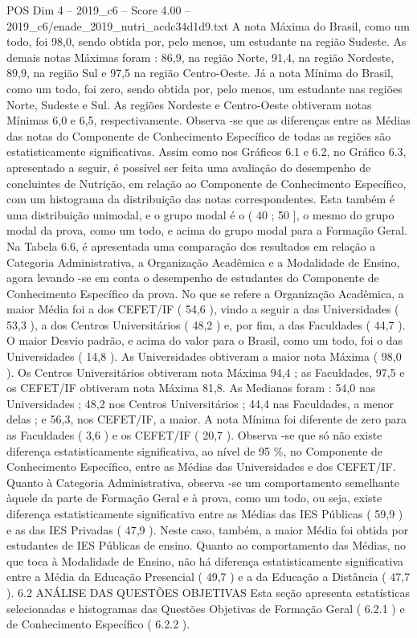 \begin{textsample}{POS Dim 4 – 2019\_c6 – Score 4.00 – 2019\_c6/enade\_2019\_nutri\_acdc34d1d9.txt}
A nota Máxima do Brasil, como um todo, foi 98,0, sendo obtida por, pelo menos, um estudante na região Sudeste.
As demais notas Máximas foram : 86,9, na região Norte, 91,4, na região Nordeste, 89,9, na região Sul e 97,5 na região Centro-Oeste.
Já a nota Mínima do Brasil, como um todo, foi zero, sendo obtida por, pelo menos, um estudante nas regiões Norte, Sudeste e Sul.
As regiões Nordeste e Centro-Oeste obtiveram notas Mínimas 6,0 e 6,5, respectivamente.
Observa -se que as diferenças entre as Médias das notas do Componente de Conhecimento Específico de todas as regiões são estatisticamente significativas.
Assim como nos Gráficos 6.1 e 6.2, no Gráfico 6.3, apresentado a seguir, é possível ser feita uma avaliação do desempenho de concluintes de Nutrição, em relação ao Componente de Conhecimento Específico, com um histograma da distribuição das notas correspondentes.
Esta também é uma distribuição unimodal, e o grupo modal é o ( 40 ; 50 ], o mesmo do grupo modal da prova, como um todo, e acima do grupo modal para a Formação Geral.
Na Tabela 6.6, é apresentada uma comparação dos resultados em relação a Categoria Administrativa, a Organização Acadêmica e a Modalidade de Ensino, agora levando -se em conta o desempenho de estudantes do Componente de Conhecimento Específico da prova.
No que se refere a Organização Acadêmica, a maior Média foi a dos CEFET/IF ( 54,6 ), vindo a seguir a das Universidades ( 53,3 ), a dos Centros Universitários ( 48,2 ) e, por fim, a das Faculdades ( 44,7 ).
O maior Desvio padrão, e acima do valor para o Brasil, como um todo, foi o das Universidades ( 14,8 ).
As Universidades obtiveram a maior nota Máxima ( 98,0 ).
Os Centros Universitários obtiveram nota Máxima 94,4 ; as Faculdades, 97,5 e os CEFET/IF obtiveram nota Máxima 81,8.
As Medianas foram : 54,0 nas Universidades ; 48,2 nos Centros Universitários ; 44,4 nas Faculdades, a menor delas ; e 56,3, nos CEFET/IF, a maior.
A nota Mínima foi diferente de zero para as Faculdades ( 3,6 ) e os CEFET/IF ( 20,7 ).
Observa -se que só não existe diferença estatisticamente significativa, ao nível de 95 \%, no Componente de Conhecimento Específico, entre as Médias das Universidades e dos CEFET/IF.
Quanto à Categoria Administrativa, observa -se um comportamento semelhante àquele da parte de Formação Geral e à prova, como um todo, ou seja, existe diferença estatisticamente significativa entre as Médias das IES Públicas ( 59,9 ) e as das IES Privadas ( 47,9 ).
Neste caso, também, a maior Média foi obtida por estudantes de IES Públicas de ensino.
Quanto ao comportamento das Médias, no que toca à Modalidade de Ensino, não há diferença estatisticamente significativa entre a Média da Educação Presencial ( 49,7 ) e a da Educação a Distância ( 47,7 ). 6.2 ANÁLISE DAS QUESTÕES OBJETIVAS Esta seção apresenta estatísticas selecionadas e histogramas das Questões Objetivas de Formação Geral ( 6.2.1 ) e de Conhecimento Específico ( 6.2.2 ).

\end{textsample}
